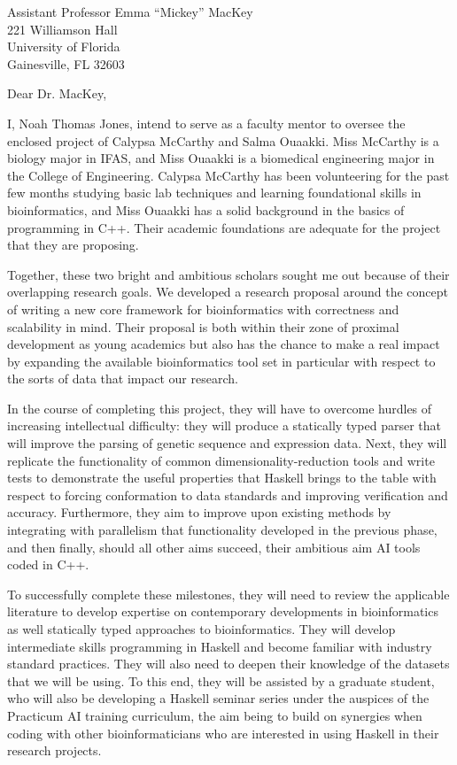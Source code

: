 \documentclass[10pt,letterpaper]{letter}
\begin{document}
\begin{letter}{Assistant Professor Emma ``Mickey'' MacKey \\ 221 Williamson Hall
\\ University of Florida \\ Gainesville, FL 32603}
\opening{Dear Dr. MacKey,}

I, Noah Thomas Jones, intend to serve as a faculty mentor to oversee the enclosed project of Calypsa McCarthy and Salma Ouaakki. Miss McCarthy is a biology major in IFAS, and Miss Ouaakki is a biomedical engineering major in the College of Engineering. Calypsa McCarthy has been volunteering for the past few months studying basic lab techniques and learning foundational skills in bioinformatics, and Miss Ouaakki has a solid background in the basics of programming in C++. Their academic foundations are adequate for the project that they are proposing.

Together, these two bright and ambitious scholars sought me out because of their overlapping research goals. We developed a research proposal around the concept of writing a new core framework for bioinformatics with correctness and scalability in mind. Their proposal is both within their zone of proximal development as young academics but also has the chance to make a real impact by expanding the available bioinformatics tool set in particular with respect to the sorts of data that impact our research.

In the course of completing this project, they will have to overcome hurdles of increasing intellectual difficulty: they will produce a statically typed parser that will improve the parsing of genetic sequence and expression data. Next, they will replicate the functionality of common dimensionality-reduction tools and write tests to demonstrate the useful properties that Haskell brings to the table with respect to forcing conformation to data standards and improving verification and accuracy. Furthermore, they aim to improve upon existing methods by integrating with parallelism that functionality developed in the previous phase, and then finally, should all other aims succeed, their ambitious aim AI tools coded in C++.

To successfully complete these milestones, they will need to review the applicable literature to develop expertise on contemporary developments in bioinformatics as well statically typed approaches to bioinformatics. They will develop intermediate skills programming in Haskell and become familiar with industry standard practices. They will also need to deepen their knowledge of the datasets that we will be using. To this end, they will be assisted by a graduate student, who will also be developing a Haskell seminar series under the auspices of the Practicum AI training curriculum, the aim being to build on synergies when coding with other bioinformaticians who are interested in using Haskell in their research projects.


\end{letter}
\end{document}
